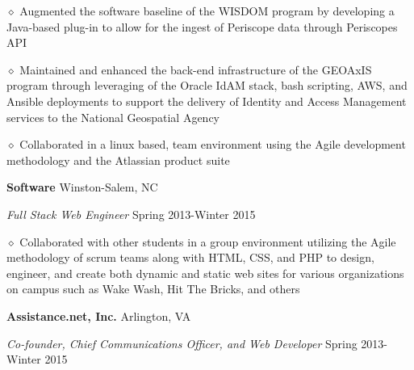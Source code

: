 \documentclass[executivepaper]{extarticle}
\begin{document}
\begin{center}
{\begin{minipage}{7.0in}
{\noindent $\diamond$ {\fontsize{12}{8}\selectfont Augmented the software baseline of the WISDOM program by developing a Java-based plug-in to allow for the ingest of Periscope data through Periscope\textsc{}s API}}

\vspace{0.25mm}

{\noindent $\diamond$ {\fontsize{12}{8}\selectfont Maintained and enhanced the back-end infrastructure of the GEOAxIS program through leveraging of the Oracle IdAM stack, bash scripting, AWS, and Ansible deployments to support the delivery of Identity and Access Management services to the National Geospatial Agency}}

\vspace{0.25mm}

{\noindent $\diamond$ {\fontsize{12}{8}\selectfont Collaborated in a linux based, team environment using the Agile development methodology and the Atlassian product suite}}

\vspace{2mm}

{\noindent \textbf{\fontsize{12}{8} Software}} {\hfill \fontsize{10}{8}\selectfont Winston-Salem, NC}

\vspace{0.25mm}

{\noindent \textit{\fontsize{12}{8}\selectfont Full Stack Web Engineer}} {\hfill \fontsize{10}{8}\selectfont Spring 2013-Winter 2015}

\vspace{0.25mm}

{\noindent $\diamond$ {\fontsize{12}{8}\selectfont Collaborated with other students in a group environment utilizing the Agile methodology of scrum teams along with
HTML, CSS, and PHP to design, engineer, and create both dynamic and static web sites for various organizations on campus such as Wake Wash, Hit The Bricks, and others}}

\vspace{2mm}

{\noindent \textbf{\fontsize{12}{8}\selectfont Assistance.net, Inc.}} {\hfill \fontsize{10}{8}\selectfont Arlington, VA}

\vspace{0.25mm}

{\noindent \textit{\fontsize{12}{8}\selectfont Co-founder, Chief Communications Officer, and Web Developer}} {\hfill \fontsize{10}{8}\selectfont Spring 2013-Winter 2015}

\vspace{0.25mm}


\end{minipage}}
\end{center}
\end{document}

